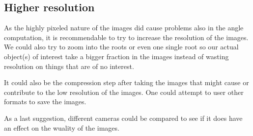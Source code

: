 \subsection{Higher resolution}


As the highly pixeled nature of the images did cause problems also in the angle computation, it is recommendable to try to increase the resolution of the images. We could also try to zoom into the roots or even one single root so our actual object(s) of interest take a bigger fraction in the images instead of wasting resolution on things that are of no interest. 

It could also be the compression step after taking the images that might cause or contribute to the low resolution of the images. One could attempt to user other formats to save the images. 

As a last suggestion, different cameras could be compared to see if it does have an effect on the wuality of the images. 




